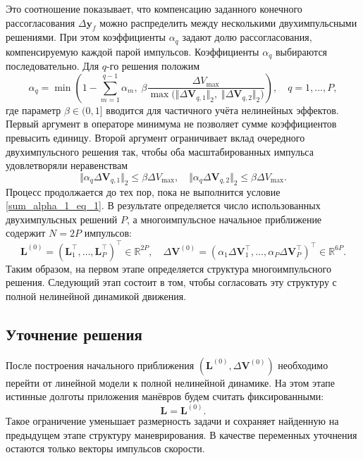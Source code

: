 Это соотношение показывает, что компенсацию заданного конечного рассогласования $\Delta \mathbf{y}_f$ можно распределить между несколькими двухимпульсными решениями. При этом коэффициенты $\alpha_q$ задают долю рассогласования, компенсируемую каждой парой импульсов. Коэффициенты $\alpha_q$ выбираются последовательно. Для $q$-го решения положим
\begin{equation}
    \alpha_q = \min \left(
    1 - \sum_{m=1}^{q-1} \alpha_m, \;
    \beta \frac{\Delta V_{\max}}
    {\max \bigl( \Vert \Delta \mathbf{V}_{q, 1} \Vert_2,\; \Vert \Delta \mathbf{V}_{q, 2}\Vert_2 \bigr)}\right), \quad
    q = 1, \dots, P,
\end{equation}
где параметр $\beta \in (0, 1]$ вводится для частичного учёта нелинейных эффектов. Первый аргумент в операторе минимума не позволяет сумме коэффициентов превысить единицу. Второй аргумент ограничивает вклад очередного двухимпульсного решения так, чтобы оба масштабированных импульса удовлетворяли неравенствам
\begin{equation}
    \Vert \alpha_q \Delta \mathbf{V}_{q, 1} \Vert_2 \leq \beta \Delta V_{\max}, \quad
    \Vert \alpha_q \Delta \mathbf{V}_{q, 2} \Vert_2 \leq \beta \Delta V_{\max}.
\end{equation}
Процесс продолжается до тех пор, пока не выполнится условие \eqref{sum_alpha_1_eq_1}. В результате определяется число использованных двухимпульсных решений $P$, а многоимпульсное начальное приближение содержит $N = 2P$ импульсов:
\begin{equation}
    \mathbf{L}^{(0)} = \left( \mathbf{L}_1^\top, \dots, \mathbf{L}_P^\top \right)^\top \in \mathbb{R}^{2P}, \quad
    \Delta \mathbf{V}^{(0)} = \left( \alpha_1 \Delta \mathbf{V}_1^\top, \dots, \alpha_P \Delta \mathbf{V}_P^\top \right)^\top \in \mathbb{R}^{6P}.
\label{initial_guess}
\end{equation}
Таким образом, на первом этапе определяется структура многоимпульсного решения. Следующий этап состоит в том, чтобы согласовать эту структуру с полной нелинейной динамикой движения.

\subsection{Уточнение решения}

После построения начального приближения $\left( \mathbf{L}^{(0)}, \Delta \mathbf{V}^{(0)} \right)$ необходимо перейти от линейной модели к полной нелинейной динамике. На этом этапе истинные долготы приложения манёвров будем считать фиксированными:
\begin{equation}
    \mathbf{L} = \mathbf{L}^{(0)}.
\end{equation}
Такое ограничение уменьшает размерность задачи и сохраняет найденную на предыдущем этапе структуру маневрирования. В качестве переменных уточнения остаются только векторы импульсов скорости.


